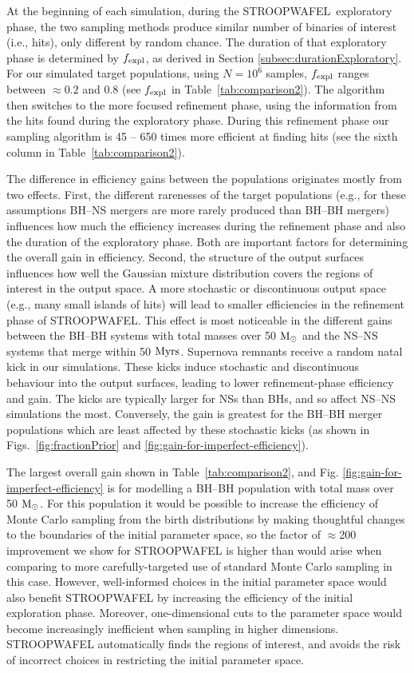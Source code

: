 \documentclass[a4paper,fleqn,usenatbib,useAMS,usedcolumn]{mnras}
\newcommand{\AISs}{\textsc{STROOPWAFEL}}
\begin{document}
At the beginning of each simulation, during the \AISs \ exploratory phase, the two sampling methods produce similar number of binaries of interest (i.e., hits), only different by random chance.  The duration of that exploratory phase is determined by $f_{\rm{expl}}$, as derived in Section \ref{subsec:durationExploratory}. For our simulated target populations, using $N=10^6$ samples, $f_{\rm{expl}}$ ranges between $\approx 0.2$ and $0.8$ (see $f_{\rm{expl}}$ in Table~\ref{tab:comparison2}).   The algorithm then switches to the more focused refinement phase, using the information from the hits found during the exploratory phase.   During this refinement phase our sampling algorithm is 45 -- 650 times more efficient at finding hits (see the sixth column in Table~\ref{tab:comparison2}).    

The difference in efficiency gains between the populations originates mostly from two effects. First, the different rarenesses of the target populations (e.g., for these assumptions BH--NS mergers are more rarely produced than BH--BH mergers) influences how much the efficiency increases during the refinement phase and also the duration of the exploratory phase. Both are important factors for determining the overall gain in efficiency.   Second, the structure of the output surfaces influences how well the Gaussian mixture distribution covers the regions of interest in the output space. A more stochastic or discontinuous output space (e.g., many small islands of hits) will lead to smaller  efficiencies in the refinement phase of \AISs. This effect is most noticeable in the different gains between the BH--BH systems with total masses over 50 $\rm{M}_{\odot}$ and the NS--NS systems that merge within 50 $\rm{Myrs}$. Supernova remnants receive a random natal kick in our simulations.   These kicks induce stochastic and discontinuous behaviour into the output surfaces, leading to lower refinement-phase efficiency and gain.   The kicks are typically larger for NSs than BHs, and so affect NS--NS simulations the most.   Conversely, the gain is greatest for the BH--BH merger populations which are least affected by these stochastic kicks (as shown in Figs.~\ref{fig:fractionPrior} and \ref{fig:gain-for-imperfect-efficiency}).

The largest overall gain shown in Table~\ref{tab:comparison2}, and Fig. \ref{fig:gain-for-imperfect-efficiency} is for modelling a BH--BH population with total mass over 50 $\rm{M}_{\odot}$. For this population it would be possible to increase the efficiency of Monte Carlo sampling from the birth distributions by making thoughtful changes to the boundaries of the initial parameter space, so the factor of $\approx$200 improvement we show for \AISs{} is higher than would arise when comparing to more carefully-targeted use of standard Monte Carlo sampling in this case.  However, well-informed choices in the initial parameter space would also benefit \AISs{} by increasing the efficiency of the initial exploration phase. Moreover, one-dimensional cuts to the parameter space would become increasingly inefficient when sampling in higher dimensions.  \AISs{} automatically finds the regions of interest, and avoids the risk of incorrect choices in restricting the initial parameter space.
\end{document}
